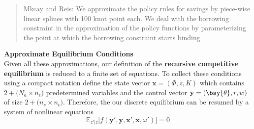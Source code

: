 \documentclass[a4paper,10pt]{article}  %
\begin{document}
\begin{quote}
   Mkcay and Reis: We approximate the policy rules for savings by piece-wise linear splines with
   100 knot point each. We deal with the borrowing constraint in the approximation of the policy
   functions by parameterizing the point at which the borrowing constraint starts binding
\end{quote}

\textbf{Approximate Equilibrium Conditions} \\ Given all these approximations, our definition of the
\textbf{recursive competitive equilibrium} is reduced to a finite set of equations.
To collect these conditions using a compact notation define the state vector $ \mathbf{x} = (\Phi,z, K ) $ which contains
$2 + \big(N_a \times n_{\epsilon} \big)$
predetermined variables
and the control vector $ \mathbf{y} = ( \bsy{\theta}, r, w )  $ of size
$2 +\big(n_s \times n_{\epsilon}\big)$.
Therefore, the our discrete equilibrium can be resumed by a system of nonlinear equations
\begin{equation}
   \label{eq:SYSTEM}
   \mathbb{E}_{z'|z} \Big[ f(\mathbf{y}',\mathbf{y},\mathbf{x}',\mathbf{x}, \omega') \Big] = 0
\end{equation}
\end{document}

